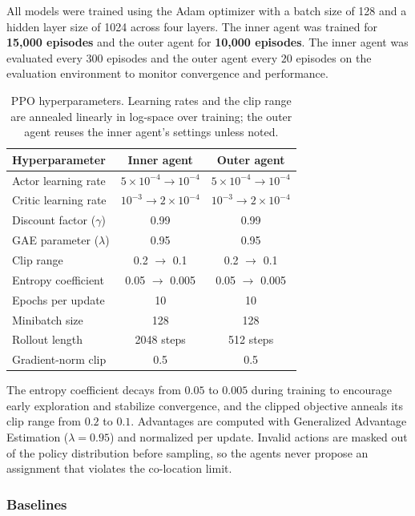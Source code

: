 \documentclass{article}
\begin{document}
All models were trained using the Adam optimizer with a batch size of 128 and a hidden layer size of 1024 across four layers. The inner agent was trained for \textbf{15{,}000 episodes} and the outer agent for \textbf{10{,}000 episodes}. The inner agent was evaluated every $300$ episodes and the outer agent every $20$ episodes on the evaluation environment to monitor convergence and performance.

\begin{table}[tb]
\centering
\caption{PPO hyperparameters. Learning rates and the clip range are annealed
linearly in log-space over training; the outer agent reuses the inner agent's
settings unless noted.}
\label{tab:hyperparams}
\begin{tabular}{lcc}
\toprule
\textbf{Hyperparameter} & \textbf{Inner agent} & \textbf{Outer agent} \\
\midrule
Actor learning rate  & $5\times10^{-4} \to 10^{-4}$ & $5\times10^{-4} \to 10^{-4}$ \\
Critic learning rate & $10^{-3} \to 2\times10^{-4}$ & $10^{-3} \to 2\times10^{-4}$ \\
\addlinespace
Discount factor ($\gamma$) & 0.99 & 0.99 \\
GAE parameter ($\lambda$)  & 0.95 & 0.95 \\
Clip range                 & 0.2 $\to$ 0.1 & 0.2 $\to$ 0.1 \\
Entropy coefficient        & 0.05 $\to$ 0.005 & 0.05 $\to$ 0.005 \\
\addlinespace
Epochs per update  & 10 & 10 \\
Minibatch size     & 128 & 128 \\
Rollout length     & 2048 steps & 512 steps \\
Gradient-norm clip & 0.5 & 0.5 \\
\bottomrule
\end{tabular}
\end{table}

The entropy coefficient decays from $0.05$ to $0.005$ during training to encourage early exploration and stabilize convergence, and the clipped objective anneals its clip range from $0.2$ to $0.1$. Advantages are computed with Generalized Advantage Estimation ($\lambda = 0.95$) and normalized per update. Invalid actions are masked out of the policy distribution before sampling, so the agents never propose an assignment that violates the co-location limit.

\subsubsection*{Baselines}
\end{document}
